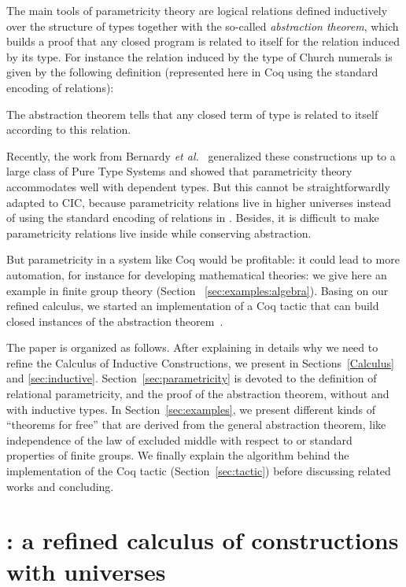 \documentclass[a4paper,USenglish]{lipics}
\def\coq{\textsf{Coq}\xspace}
\def\cic{\textsf{CIC}\xspace}
\def\cicr{\xspace}
\begin{document}
The main tools of parametricity theory are logical relations defined
inductively over the structure of types together with the so-called
\emph{abstraction theorem}, which builds a proof that any closed program is related to itself for the
relation induced by its type. For instance the relation induced by the type
 of Church numerals is given by the following definition
(represented here in \coq using the standard encoding of relations):

The abstraction theorem tells that any closed term  of
type  is related to itself according to this relation.

Recently, the work from Bernardy \emph{et
al.}~\cite{DBLP:conf/icfp/BernardyJP10} generalized these constructions up
to a large class of Pure Type Systems and showed that parametricity theory
accommodates well with dependent types. But this cannot be straightforwardly
adapted to \cic, because parametricity relations live in higher universes
instead of using the standard encoding of relations in . Besides,
it is difficult to make parametricity relations live inside  while
conserving abstraction.

But parametricity in a system like \coq would be profitable: it could lead to
more automation, for instance for developing mathematical theories: we
give here an example in finite group theory (Section ~\ref{sec:examples:algebra}). Basing on our refined calculus,
we started an implementation of a \coq tactic that can build closed instances
of the abstraction theorem~\cite{implem12}.

The paper is organized as follows. After explaining in details why we
need to refine the Calculus of Inductive Constructions, we present
\cicr in Sections~\ref{Calculus} and \ref{sec:inductive}.
Section~\ref{sec:parametricity} is devoted to the definition of
relational parametricity, and the proof of the abstraction
theorem, without and with inductive types. In
Section~\ref{sec:examples}, we present different kinds of ``theorems for
free'' that are derived from the general abstraction theorem, like
independence of the law of excluded middle with respect to \cicr or standard
properties of finite groups. We finally
explain the algorithm behind the implementation of the \coq tactic
(Section~\ref{sec:tactic}) before discussing related works and
concluding.


\section{\label{Calculus}\cicr: a refined calculus of constructions with universes}
\end{document}

